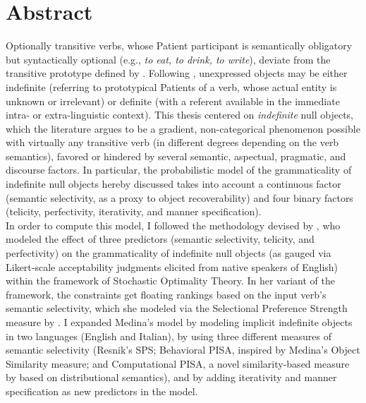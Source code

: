\chapter*{Abstract}

Optionally transitive verbs, whose Patient participant is semantically obligatory but syntactically optional (e.g., \textit{to eat, to drink, to write}), deviate from the transitive prototype defined by \textcite{HopperThompson1980}. Following \textcite{Fillmore1986}, unexpressed objects may be either indefinite (referring to prototypical Patients of a verb, whose actual entity is unknown or irrelevant) or definite (with a referent available in the immediate intra- or extra-linguistic context). This thesis centered on \textit{indefinite} null objects, which the literature argues to be a gradient, non-categorical phenomenon possible with virtually any transitive verb (in different degrees depending on the verb semantics), favored or hindered by several semantic, aspectual, pragmatic, and discourse factors. In particular, the probabilistic model of the grammaticality of indefinite null objects hereby discussed takes into account a continuous factor (semantic selectivity, as a proxy to object recoverability) and four binary factors (telicity, perfectivity, iterativity, and manner specification).\\
In order to compute this model, I followed the methodology devised by \textcite{Medina2007}, who modeled the effect of three predictors (semantic selectivity, telicity, and perfectivity) on the grammaticality of indefinite null objects (as gauged via Likert-scale acceptability judgments elicited from native speakers of English) within the framework of Stochastic Optimality Theory. In her variant of the framework, the constraints get floating rankings based on the input verb's semantic selectivity, which she modeled via the Selectional Preference Strength measure by \textcite{Resnik1993, Resnik1996}. I expanded Medina's model by modeling implicit indefinite objects in two languages (English and Italian), by using three different measures of semantic selectivity (Resnik's SPS; Behavioral PISA, inspired by Medina's Object Similarity measure; and Computational PISA, a novel similarity-based measure by \textcite{CappelliLenciPISA} based on distributional semantics), and by adding iterativity and manner specification as new predictors in the model.\\ %
